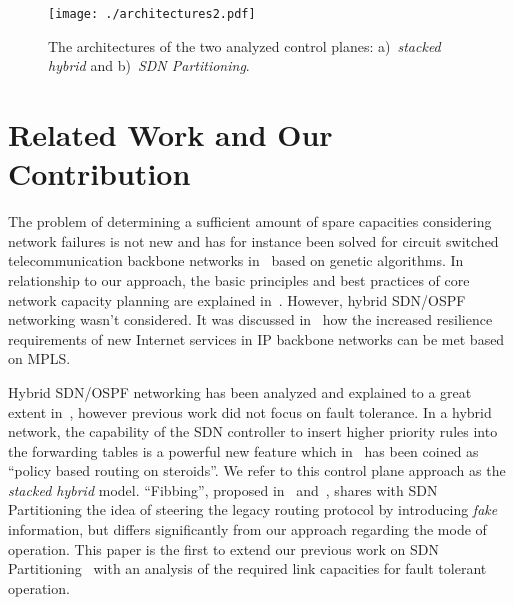 \documentclass[10pt, conference]{IEEEtran}
\begin{document}
\begin{figure*}[t] \center
\texttt{[image: ./architectures2.pdf]}
\caption{The architectures of the two analyzed control planes: a)~\emph{stacked hybrid} and b)~\emph{SDN Partitioning}.}
\label{arch} \end{figure*}


\section{Related Work and Our Contribution}\label{relatedwork}
The problem of determining a sufficient amount of spare capacities considering network failures is not new and has for instance been solved for circuit switched telecommunication backbone networks in~\cite{alrumaih} based on genetic algorithms. In relationship to our approach, the basic principles and best practices of core network capacity planning are explained in~\cite{cisco_cap_planning}. However, hybrid SDN/OSPF networking wasn't considered. It was discussed in~\cite{Kirstaedter} how the increased resilience requirements of new Internet services in IP backbone networks can be met based on MPLS. 

\par Hybrid SDN/OSPF networking has been analyzed and explained to a great extent in~\cite{hybrid_1, hybrid_2, hybrid_3, hybrid_4, Brockners, Vissicchio2, tamal_ICC}, however previous work did not focus on fault tolerance. In a hybrid network, the capability of the SDN controller to insert higher priority rules into the forwarding tables is a powerful new feature which in~\cite{steroids} has  been coined as ``policy based routing on steroids''. We refer to this control plane approach as the \emph{stacked hybrid} model. ``Fibbing'', proposed in~\cite{fibbing1} and~\cite{fibbing2}, shares with SDN Partitioning the idea of steering the legacy routing protocol by introducing \emph{fake} information, but differs significantly from our approach regarding the mode of operation. This paper is the first to extend our previous work on SDN Partitioning~\cite{divideandconquer, caria_HPSR, caria_TNSM} with an analysis of the required link capacities for fault tolerant operation.
\end{document}
